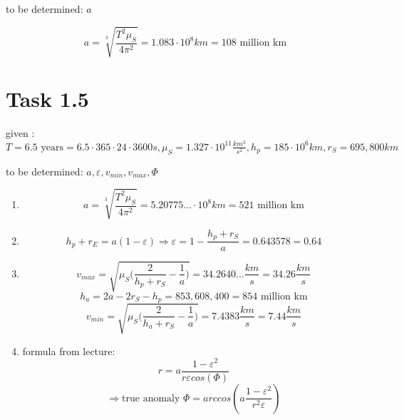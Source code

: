 \documentclass[a4paper,12pt]{article}
\begin{document}
\noindent to be determined: $a$

\[ a = \sqrt[3]{\frac{T^2\mu_S}{4\pi^2}} = 1.083 \cdot 10^8 km = 108 \text{ million km} \]

\section*{Task 1.5}
given : $T = 6.5 \text{ years} = 6.5\cdot365\cdot24\cdot3600 s, \mu_S = 1.327\cdot 10^{11} \frac{km^3}{s^2}, h_p = 185\cdot 10^6 km, r_S = 695,800 km$

\noindent to be determined: $a, \varepsilon, v_{min}, v_{max}, \Phi$
\begin{enumerate}
 \item \[ a = \sqrt[3]{\frac{T^2\mu_S}{4\pi^2}} = 5.20775... \cdot 10^8 km = 521 \text{ million km} \]
 \item \[ h_p + r_E = a(1-\varepsilon) \Rightarrow \varepsilon = 1 - \frac{h_p + r_S}{a} = 0.643578 = 0.64 \]
 \item \[ v_{max} = \sqrt{\mu_S\bigg(\frac{2}{h_p+r_S} - \frac{1}{a}\bigg)} = 34.2640... \frac{km}{s} = 34.26 \frac{km}{s} \]
 \[ h_a = 2a - 2r_S -h_p = 853,608,400 = 854 \text{ million km} \]
 \[ v_{min} = \sqrt{\mu_S\bigg(\frac{2}{h_a+r_S} - \frac{1}{a}\bigg)} = 7.4383 \frac{km}{s} = 7.44 \frac{km}{s}\]
 \item formula from lecture: 
 \[r = a\frac{1-\varepsilon^2}{r\varepsilon cos(\Phi)}\]
 \[\Rightarrow \text{true anomaly } \Phi = arccos(a\frac{1-\varepsilon^2}{r^2\varepsilon})\]
\end{enumerate}
\end{document}

